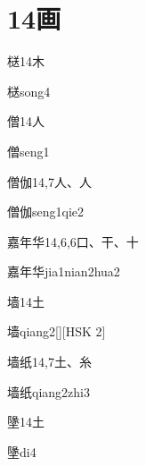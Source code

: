 
\section*{14画}

\begin{entry}{㮸}{14}{⽊}
  \begin{phonetics}{㮸}{song4}
  \end{phonetics}
\end{entry}

\begin{entry}{僧}{14}{⼈}
  \begin{phonetics}{僧}{seng1}
  \end{phonetics}
\end{entry}

\begin{entry}{僧伽}{14,7}{⼈、⼈}
  \begin{phonetics}{僧伽}{seng1qie2}
  \end{phonetics}
\end{entry}

\begin{entry}{嘉年华}{14,6,6}{⼝、⼲、⼗}
  \begin{phonetics}{嘉年华}{jia1nian2hua2}
  \end{phonetics}
\end{entry}

\begin{entry}{墙}{14}{⼟}
  \begin{phonetics}{墙}{qiang2}[][HSK 2]
  \end{phonetics}
\end{entry}

\begin{entry}{墙纸}{14,7}{⼟、⽷}
  \begin{phonetics}{墙纸}{qiang2zhi3}
  \end{phonetics}
\end{entry}

\begin{entry}{墬}{14}{⼟}
  \begin{phonetics}{墬}{di4}
  \end{phonetics}
\end{entry}

